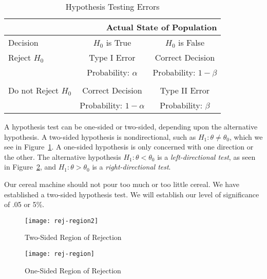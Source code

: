 \begin{table}[htbp]
   \centering
   \begin{tabular}{@{} lcc @{}}
      \toprule %
      \multicolumn{3}{r}{Actual State of Population} \\
      \hline
       Decision    & $H_0$ is True & $H_0$ is False\\
      \hline
      Reject $H_0$  & Type I Error & Correct Decision \\
      & Probability: $\alpha$ & Probability: $1- \beta$  \\
      \\
      Do not Reject $H_0$   & Correct Decision  & Type II Error \\
      & Probability: $1-\alpha$ & Probability: $\beta$  \\
      \bottomrule %
   \end{tabular}
   \caption{Hypothesis Testing Errors}
   \label{tab:hyp-test-err}
\end{table}

\marginpar{\begin{small}\begin{flushleft}\textcolor{blue}{Two-sided hypothesis test divides the $\alpha$ equally on both tails.}\end{flushleft}\end{small}}
A hypothesis test can be one-sided or two-sided, depending upon the alternative hypothesis. A two-sided hypothesis is nondirectional, such as $H_1: \theta \ne \theta_0$, which we see in Figure~\ref{figure:rej-region2}. A one-sided hypothesis is only concerned with one direction or the other. The alternative hypothesis $H_1: \theta < \theta_0$ is a \emph{left-directional test}, as seen in Figure~\ref{figure:rej-region}, and $H_1: \theta > \theta_0$ is a \emph{right-directional test}.

Our cereal machine should not pour too much or too little cereal. We have established a two-sided hypothesis test. We will establish our level of significance of .05 or 5\%.

\begin{figure}[t]
  \centering
  \texttt{[image: rej-region2]}
  \caption{Two-Sided Region of Rejection}
  \label{figure:rej-region2}
\end{figure}
\begin{figure}[t]
  \centering
  \texttt{[image: rej-region]}
  \caption{One-Sided Region of Rejection}
  \label{figure:rej-region}
\end{figure}

